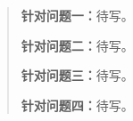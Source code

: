 \begin{abstract}

\textbf{针对问题一：}待写。

\textbf{针对问题二：}待写。

\textbf{针对问题三：}待写。

\textbf{针对问题四：}待写。


\end{abstract}
